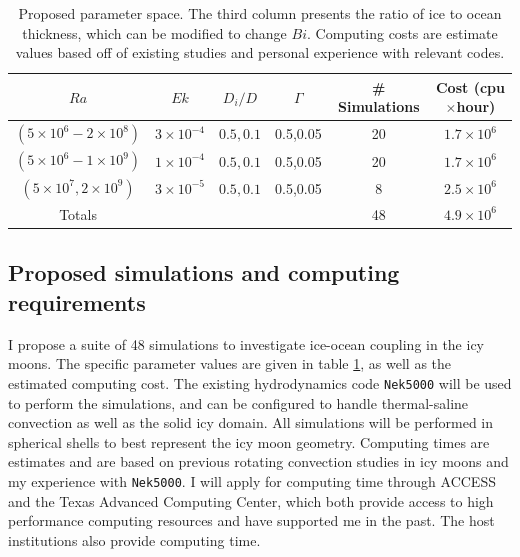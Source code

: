 \documentclass[12pt]{article}
\def\lb{\left(}
\def\rb{\right)}
\begin{document}
\begin{table}
\begin{center}
\begin{tabular}{|c|c|c|c|c|c|}
\hline
$Ra$&$Ek$&$D_{i}/D$& $\Gamma$ &\# Simulations & Cost (cpu$\times$hour)\\
		\hline
$\lb 5 \times 10^{6} - 2 \times 10^{8} \rb $ & $3 \times 10^{-4} $ & $0.5,0.1$&0.5,0.05&20&$1.7 \times 10^{6}$\\
  	\hline
$\lb 5 \times 10^{6} - 1 \times 10^{9} \rb $ & $1 \times 10^{-4} $ & $0.5,0.1$&0.5,0.05&20&$1.7\times 10^{6}$\\
  	\hline
$\lb 5\times 10^{7}, 2 \times 10^{9} \rb $ & $3 \times 10^{-5} $ & $0.5,0.1$&0.5,0.05&8&$2.5\times 10^6$\\
		\hline
		\hline
Totals & & & &48&$4.9 \times 10^6$ \\
		\hline
\end{tabular}
\end{center}
\caption{Proposed parameter space. The third column presents the ratio of ice to ocean thickness, which can be modified to change $Bi$. Computing costs are estimate values based off of existing studies \citep{dL23,rM19} and personal experience with relevant codes.}
\label{t:param}
\end{table}


\subsection{Proposed simulations and computing requirements}
I propose a suite of 48 simulations to investigate ice-ocean coupling in the icy moons. The specific parameter values are given in table \ref{t:param}, as well as the estimated computing cost.  The existing hydrodynamics code \texttt{Nek5000}\citep{nek5000} will be used to perform the simulations, and can be configured to handle thermal-saline convection as well as the solid icy domain.
All simulations will be performed in spherical shells to best represent the icy moon geometry.
Computing times are estimates and are based on previous rotating convection studies in icy moons \citep{dL23} and my experience with \texttt{Nek5000}.
 I will apply for computing time through ACCESS and the Texas Advanced Computing Center, which both provide access to high performance computing resources and have supported me in the past. The host institutions also provide computing time.
\end{document}
